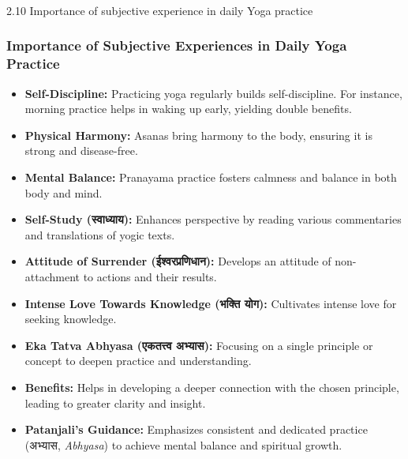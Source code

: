 \begin{frame}[fragile]\frametitle{}
\begin{center}
{\Large 2.10  Importance of subjective experience in daily Yoga practice}
\end{center}
\end{frame}

\begin{frame}[fragile]\frametitle{Importance of Subjective Experiences in Daily Yoga Practice}
    \begin{itemize}
        \item \textbf{Self-Discipline:} Practicing yoga regularly builds self-discipline. For instance, morning practice helps in waking up early, yielding double benefits.
        \item \textbf{Physical Harmony:} Asanas bring harmony to the body, ensuring it is strong and disease-free.
        \item \textbf{Mental Balance:} Pranayama practice fosters calmness and balance in both body and mind.
        \item \textbf{Self-Study (स्वाध्याय):} Enhances perspective by reading various commentaries and translations of yogic texts.
        \item \textbf{Attitude of Surrender (ईश्वरप्रणिधान):} Develops an attitude of non-attachment to actions and their results.
        \item \textbf{Intense Love Towards Knowledge (भक्ति योग):} Cultivates intense love for seeking knowledge.
        \item \textbf{Eka Tatva Abhyasa (एकतत्त्व अभ्यास):} Focusing on a single principle or concept to deepen practice and understanding.
        \item \textbf{Benefits:} Helps in developing a deeper connection with the chosen principle, leading to greater clarity and insight.
        \item \textbf{Patanjali's Guidance:} Emphasizes consistent and dedicated practice (अभ्यास, \textit{Abhyasa}) to achieve mental balance and spiritual growth.
    \end{itemize}
\end{frame}

